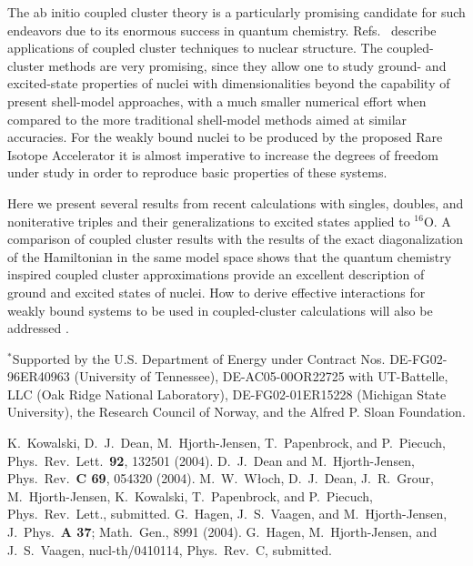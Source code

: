 \documentclass[10pt]{article}
\begin{document}
The ab initio coupled cluster theory is a particularly promising
candidate for such endeavors due to its enormous success in quantum
chemistry. Refs.~\cite{prl,prc,prl2} 
describe applications of coupled cluster techniques to
nuclear structure. The coupled-cluster methods are
very promising, since they allow one to study ground- and excited-state properties 
of nuclei
with dimensionalities beyond the capability of present shell-model
approaches, with a much smaller numerical effort when compared to
the more traditional shell-model methods aimed at similar accuracies.
For the weakly bound nuclei to be produced by the proposed Rare
Isotope Accelerator it is almost imperative to increase the
degrees of freedom under study in order to reproduce
basic properties of these systems. 

Here we present several results from recent calculations with singles,
doubles, and noniterative triples and their generalizations to
excited states applied to $^{16}$O. A comparison
of coupled cluster results with the results of the exact
diagonalization of the Hamiltonian in the same model space shows that
the quantum chemistry inspired coupled cluster approximations provide
an excellent description of ground and excited states of nuclei.
How to derive effective interactions for weakly bound systems 
to be used in
coupled-cluster calculations will also be addressed \cite{jpga,prc2}. \newline
\begin{small}
\noindent $^{*}$Supported by the U.S. Department of Energy
under
Contract Nos. DE-FG02-96ER40963 (University of Tennessee),
DE-AC05-00OR22725 with UT-Battelle, LLC (Oak Ridge
National Laboratory), DE-FG02-01ER15228 (Michigan State University),
the Research Council of Norway, and the Alfred P. Sloan Foundation.
\end{small}


\begin{enumerate}
\itemsep=-3pt 
 K.~Kowalski, D.~J.~Dean, M.~Hjorth-Jensen, T.~Papenbrock, and P.~Piecuch,
Phys.~Rev.~Lett.~{\bf 92}, 132501 (2004).
 D.~J.~Dean and M.~Hjorth-Jensen, Phys.~Rev.~{\bf C  69}, 054320 (2004).
 M.~W.~W{\l}och, D.~J.~Dean, J.~R.~Grour, 
M.~Hjorth-Jensen, K.~Kowalski, T.~Papenbrock, and P.~Piecuch,
Phys.~Rev.~Lett., submitted.
 G.~Hagen, J.~S.~Vaagen, and M.~Hjorth-Jensen,
J.~Phys.~{\bf A 37}; Math.~Gen., 8991 (2004).
 G.~Hagen, M.~Hjorth-Jensen, and J.~S.~Vaagen,
nucl-th/0410114, Phys.~Rev.~C, submitted.

\end{enumerate}
\end{document}
